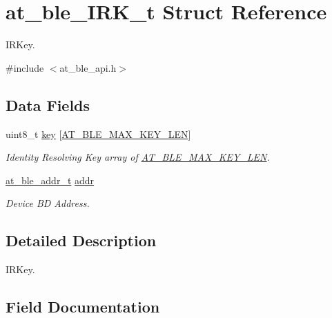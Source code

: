\hypertarget{structat__ble___i_r_k__t}{}\section{at\+\_\+ble\+\_\+\+I\+R\+K\+\_\+t Struct Reference}
\label{structat__ble___i_r_k__t}


I\+R\+Key.  




{\ttfamily \#include $<$at\+\_\+ble\+\_\+api.\+h$>$}

\subsection*{Data Fields}
\begin{DoxyCompactItemize}
\item 
uint8\+\_\+t \mbox{\hyperlink{structat__ble___i_r_k__t_abdd5757e31504574b5dc0ee379bced9f}{key}} \mbox{[}\mbox{\hyperlink{at__ble__api_8h_a462eb50567c44d7284308fe058158e99}{A\+T\+\_\+\+B\+L\+E\+\_\+\+M\+A\+X\+\_\+\+K\+E\+Y\+\_\+\+L\+EN}}\mbox{]}
\begin{DoxyCompactList}\small\item\em Identity Resolving Key array of \mbox{\hyperlink{at__ble__api_8h_a462eb50567c44d7284308fe058158e99}{A\+T\+\_\+\+B\+L\+E\+\_\+\+M\+A\+X\+\_\+\+K\+E\+Y\+\_\+\+L\+EN}}. \end{DoxyCompactList}\item 
\mbox{\hyperlink{structat__ble__addr__t}{at\+\_\+ble\+\_\+addr\+\_\+t}} \mbox{\hyperlink{structat__ble___i_r_k__t_a3b2308b9a5f2ba25679b56f12bcca1bb}{addr}}
\begin{DoxyCompactList}\small\item\em Device BD Address. \end{DoxyCompactList}\end{DoxyCompactItemize}


\subsection{Detailed Description}
I\+R\+Key. 

\subsection{Field Documentation}
\mbox{\label{structat__ble___i_r_k__t_a3b2308b9a5f2ba25679b56f12bcca1bb}} 
